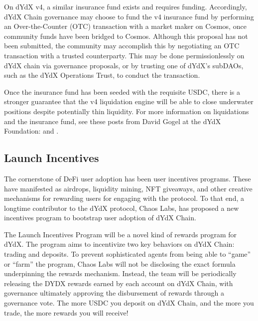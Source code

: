         On dYdX v4, a similar insurance fund exists and requires funding. Accordingly, dYdX Chain governance may choose to fund the v4 insurance fund by performing an Over-the-Counter (OTC) transaction with a market maker on Cosmos, once community funds have been bridged to Cosmos. Although this proposal has not been submitted, the community may accomplish this by negotiating an OTC transaction with a trusted counterparty. This may be done permissionlessly on dYdX chain via governance proposals, or by trusting one of dYdX's subDAOs, such as the dYdX Operations Trust, to conduct the transaction.

        Once the insurance fund has been seeded with the requisite USDC, there is a stronger guarantee that the v4 liquidation engine will be able to close underwater positions despite potentially thin liquidity. For more information on liquidations and the insurance fund, see these posts from David Gogel at the dYdX Foundation:  and .

    \subsection{Launch Incentives}

        The cornerstone of DeFi user adoption has been user incentives programs. These have manifested as airdrops, liquidity mining, NFT giveaways, and other creative mechanisms for rewarding users for engaging with the protocol. To that end, a longtime contributor to the dYdX protocol, Chaos Labs, has proposed a new incentives program to bootstrap user adoption of dYdX Chain. 

        The Launch Incentives Program will be a novel kind of rewards program for dYdX. The program aims to incentivize two key behaviors on dYdX Chain: trading and deposits. To prevent sophisticated agents from being able to ``game'' or ``farm'' the program, Chaos Labs will not be disclosing the exact formula underpinning the rewards mechanism. Instead, the team will be periodically releasing the DYDX rewards earned by each account on dYdX Chain, with governance ultimately approving the disbursement of rewards through a governance vote. The more USDC you deposit on dYdX Chain, and the more you trade, the more rewards you will receive! 

